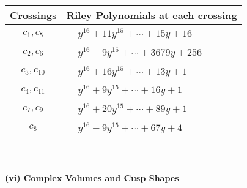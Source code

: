 \documentclass[1p]{elsarticle_modified}
\theoremstyle{definition}
\begin{document}
\begin{tabular}{m{50pt}|m{274pt}}
Crossings & \hspace{64pt}Riley Polynomials at each crossing \\
\hline $$\begin{aligned}c_{1},c_{5}\end{aligned}$$&$\begin{aligned}
&y^{16}+11 y^{15}+\cdots+15 y+16
\end{aligned}$\\
\hline $$\begin{aligned}c_{2},c_{6}\end{aligned}$$&$\begin{aligned}
&y^{16}-9 y^{15}+\cdots+3679 y+256
\end{aligned}$\\
\hline $$\begin{aligned}c_{3},c_{10}\end{aligned}$$&$\begin{aligned}
&y^{16}+16 y^{15}+\cdots+13 y+1
\end{aligned}$\\
\hline $$\begin{aligned}c_{4},c_{11}\end{aligned}$$&$\begin{aligned}
&y^{16}+9 y^{15}+\cdots+16 y+1
\end{aligned}$\\
\hline $$\begin{aligned}c_{7},c_{9}\end{aligned}$$&$\begin{aligned}
&y^{16}+20 y^{15}+\cdots+89 y+1
\end{aligned}$\\
\hline $$\begin{aligned}c_{8}\end{aligned}$$&$\begin{aligned}
&y^{16}-9 y^{15}+\cdots+67 y+4
\end{aligned}$\\
\hline
\end{tabular}\\~\\
\newpage\flushleft \textbf{(vi) Complex Volumes and Cusp Shapes}
\end{document}
